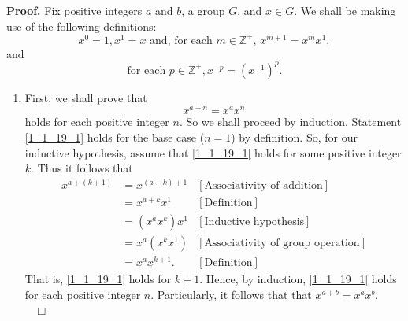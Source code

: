 \documentclass[9pt]{article}
\newcommand{\qed}{\hfill \ensuremath{\Box}}
\newcommand{\Z}{\mathbb{Z}}
\begin{document}
\begin{enumerate}
      \textbf{Proof.} Fix positive integers $a$ and $b$, a group $G$, and
      $x \in G$. We shall be making use of the following definitions: 
      $$x^0 = 1, x^1 = x \text{ and, for each $m \in \Z^+$, }
        x^{m+1} = x^mx^1,$$
      and
      $$\text{for each } p \in \Z^+, x^{-p} = (x^{-1})^p.$$
      
      \begin{enumerate}
         \item First, we shall prove that
               \begin{equation} \label{1_1_19_1}
                  x^{a+n} = x^ax^n 
               \end{equation}               
               holds for each positive integer $n$. So we shall proceed by
               induction. Statement \eqref{1_1_19_1} holds for the base
               case ($n = 1$) by definition. So, for our inductive hypothesis,
               assume that \eqref{1_1_19_1} holds for some positive integer $k$.
               Thus it follows that
               \begin{align*}
                  x^{a+(k+1)} &=x^{(a+k)+1}&[\text{Associativity of addition}]\\
                     &= x^{a+k}x^1  &[\text{Definition}] \\
                     &= (x^ax^k)x^1 &[\text{Inductive hypothesis}] \\
                     &= x^a(x^kx^1) &[\text{Associativity of group operation}]\\
                     &= x^ax^{k+1}.  &[\text{Definition}]
               \end{align*}
               That is, \eqref{1_1_19_1} holds for $k + 1$. Hence, by induction,
               \eqref{1_1_19_1} holds for each positive integer $n$.
               Particularly, it follows that that $x^{a+b} = x^ax^b$. \\
               \mbox{ } \qed \\
               

\end{enumerate}
\end{enumerate}
\end{document}
